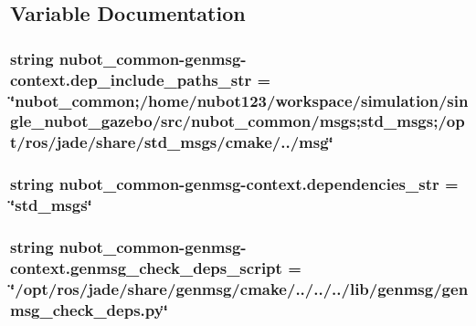 \subsection{Variable Documentation}
\hypertarget{namespacenubot__common-genmsg-context_a3cb8468ce84e82ac5e2b66290f260f4c}{
\subsubsection[{dep\-\_\-include\-\_\-paths\-\_\-str}]{\setlength{\rightskip}{0pt plus 5cm}string nubot\-\_\-common-\/genmsg-\/context.\-dep\-\_\-include\-\_\-paths\-\_\-str = \char`\"{}nubot\-\_\-common;/home/nubot123/workspace/simulation/single\-\_\-nubot\-\_\-gazebo/src/nubot\-\_\-common/msgs;std\-\_\-msgs;/opt/ros/jade/share/std\-\_\-msgs/cmake/../msg\char`\"{}}}\label{namespacenubot__common-genmsg-context_a3cb8468ce84e82ac5e2b66290f260f4c}
\hypertarget{namespacenubot__common-genmsg-context_acb3057b57eb9458421378baa13f383d0}{
\subsubsection[{dependencies\-\_\-str}]{\setlength{\rightskip}{0pt plus 5cm}string nubot\-\_\-common-\/genmsg-\/context.\-dependencies\-\_\-str = \char`\"{}std\-\_\-msgs\char`\"{}}}\label{namespacenubot__common-genmsg-context_acb3057b57eb9458421378baa13f383d0}
\hypertarget{namespacenubot__common-genmsg-context_a32a0523eb31dd66d816b3d32bd6aa2b5}{
\subsubsection[{genmsg\-\_\-check\-\_\-deps\-\_\-script}]{\setlength{\rightskip}{0pt plus 5cm}string nubot\-\_\-common-\/genmsg-\/context.\-genmsg\-\_\-check\-\_\-deps\-\_\-script = \char`\"{}/opt/ros/jade/share/genmsg/cmake/../../../lib/genmsg/genmsg\-\_\-check\-\_\-deps.\-py\char`\"{}}}\label{namespacenubot__common-genmsg-context_a32a0523eb31dd66d816b3d32bd6aa2b5}
